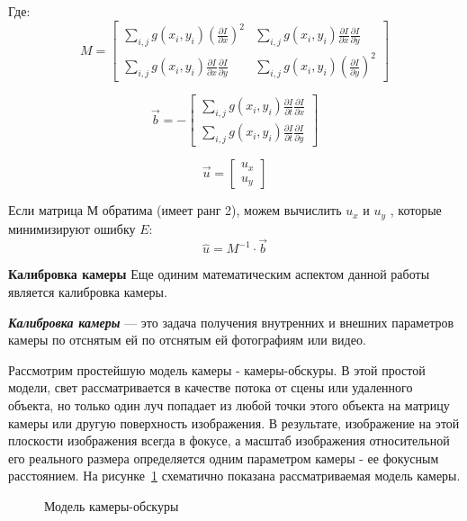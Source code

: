 Где: 
$$ M = 
\left[ 	
\begin{array}{cc}
	\sum \limits_{i,j} g(x_i, y_i) 
		\left( \frac{\partial I}{\partial x} \right)^2 
	& \sum \limits_{i,j} g(x_i, y_i) 
			\frac{\partial I}{\partial x} 										\frac{\partial I}{\partial y} 
	\\ 
	\sum \limits_{i,j} g(x_i, y_i) 
			\frac{\partial I}{\partial x} 										\frac{\partial I}{\partial y} 
	& \sum \limits_{i,j} g(x_i, y_i)
		\left( \frac{\partial I}{\partial y} \right)^2 
\end{array} 
\right]
$$

$$
\vec{b} = -
\left[ 	
\begin{array}{c}
\sum \limits_{i,j} g(x_i, y_i) 
			\frac{\partial I}{\partial t} 										\frac{\partial I}{\partial x}  \\ 
\sum \limits_{i,j} g(x_i, y_i) 
			\frac{\partial I}{\partial t} 										\frac{\partial I}{\partial y}
\end{array} 
\right]
$$

$$
\vec{u} = 
\left[ 	
\begin{array}{c}
  u_x\\ 
	u_y
\end{array} 
\right]
$$

Если матрица М обратима (имеет ранг 2), можем вычислить $u_x$ и $u_y$ , которые минимизируют ошибку $E$\cite{habrOpticalFlowAbout}:
$$
\widehat{u} = M^{-1} \cdot \vec{b}
$$

\textbf{Калибровка камеры}
\label{part:calibrateCamera}
Еще одиним математическим аспектом данной работы является калибровка камеры. 

\textit{\textbf{Калибровка камеры}} — это задача получения внутренних и внешних параметров камеры по отснятым ей по отснятым ей фотографиям или видео\cite{wikiCalibrate}.

Рассмотрим простейшую модель камеры - камеры-обскуры. В этой простой модели, свет рассматривается в качестве потока от сцены или удаленного объекта, но только один луч попадает из любой точки этого объекта на матрицу камеры или другую поверхность изображения. В результате, изображение на этой плоскости изображения всегда в фокусе, а масштаб изображения относительной его реального размера определяется одним параметром камеры - ее фокусным расстоянием. На рисунке~\ref{pic:cameraModel} схематично показана рассматриваемая модель камеры\cite{OpenCVBook}. 

\begin{figure}[!htb]
\caption{Модель камеры-обскуры}
\label{pic:cameraModel}
\end{figure}

